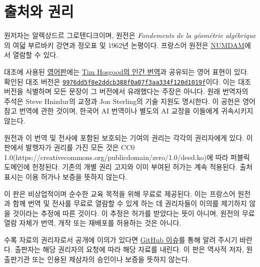 \chapter*{출처와 권리}
원저자는 알렉상드르 그로텐디크이며, 원전은
\emph{Fondements de la géométrie algébrique}의 여덟 부르바키 강연과
정오표 및 1962년 논평이다. 프랑스어 원전은
\href{https://www.numdam.org/}{NUMDAM}에서 열람할 수 있다.

대조에 사용된 \href{https://github.com/KokunoYumeto/fga-en}{영어판}에는
\href{https://github.com/thosgood/fga}{Tim Hosgood의 인간 번역}과 공유되는
영어 표현이 있다. 확인된 대조 버전은
\href{https://github.com/thosgood/fga/tree/9976dd5f8e2ddcb388f0a07f3aa334f120d1019f}{\nolinkurl{9976dd5f8e2ddcb388f0a07f3aa334f120d1019f}}이다.
이는 대조 버전을 식별하며 모든 문장이 그 버전에서 유래했다는 주장은 아니다.
원래 번역자의 주석은 Steve Hnizdur의 교정과 Jon Sterling의 기술 지원도
명시한다. 이 공헌은 영어 참고 번역에 관한 것이며, 한국어 AI 번역이나
별도의 AI 교정을 이들에게 귀속시키지 않는다.

원전과 이 번역 및 전사에 포함된 보호되는 기여의 권리는 각각의 권리자에게
있다. 이 판에서 발행자가 권리를 가진 모든 것은 CC0 1.0(https://creativecommons.org/publicdomain/zero/1.0/deed.ko)에 따라 퍼블릭 도메인에 헌정된다. 기존의 개별 권리 고지와 이미 부여된
허가는 계속 적용된다. 출처 표시는 이용 허가나 보증을 뜻하지 않는다.

이 판은 비상업적이며 순수한 교육 목적을 위해 무료로 제공된다. 이는
프랑스어 원전과 함께 번역 및 전사를 무료로 열람할 수 있게 하는 데
권리자들이 이의를 제기하지 않을 것이라는 추정에 따른 것이다.
이 추정은 허가를 받았다는 뜻이 아니며, 원전의 무료 열람 자체가 번역,
개작 또는 재배포를 허용하는 것은 아니다.

수록 자료의 권리자로서 공개에 이의가 있다면
\href{https://github.com/KokunoYumeto/fga-ko/issues}{GitHub 이슈}를 통해
알려 주시기 바란다. 출판자는 해당 권리자의 요청에 따라 해당 자료를 내린다.
이 판은 역사적 저자, 원 출판기관 또는 인용된 제삼자의 승인이나 보증을
뜻하지 않는다.
\clearpage
